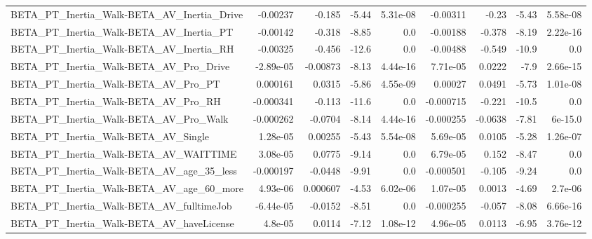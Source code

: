 \begin{tabular}{lrrrrrrrr}
BETA\_PT\_Inertia\_Walk-BETA\_AV\_Inertia\_Drive         &    -0.00237 &       -0.185 &    -5.44 & 5.31e-08 &   -0.00311 &       -0.23 &        -5.43 &      5.58e-08 \\
BETA\_PT\_Inertia\_Walk-BETA\_AV\_Inertia\_PT            &    -0.00142 &       -0.318 &    -8.85 &      0.0 &   -0.00188 &      -0.378 &        -8.19 &      2.22e-16 \\
BETA\_PT\_Inertia\_Walk-BETA\_AV\_Inertia\_RH            &    -0.00325 &       -0.456 &    -12.6 &      0.0 &   -0.00488 &      -0.549 &        -10.9 &           0.0 \\
BETA\_PT\_Inertia\_Walk-BETA\_AV\_Pro\_Drive             &   -2.89e-05 &     -0.00873 &    -8.13 & 4.44e-16 &   7.71e-05 &      0.0222 &         -7.9 &      2.66e-15 \\
BETA\_PT\_Inertia\_Walk-BETA\_AV\_Pro\_PT                &    0.000161 &       0.0315 &    -5.86 & 4.55e-09 &    0.00027 &      0.0491 &        -5.73 &      1.01e-08 \\
BETA\_PT\_Inertia\_Walk-BETA\_AV\_Pro\_RH                &   -0.000341 &       -0.113 &    -11.6 &      0.0 &  -0.000715 &      -0.221 &        -10.5 &           0.0 \\
BETA\_PT\_Inertia\_Walk-BETA\_AV\_Pro\_Walk              &   -0.000262 &      -0.0704 &    -8.14 & 4.44e-16 &  -0.000255 &     -0.0638 &        -7.81 &       6e-15.0 \\
BETA\_PT\_Inertia\_Walk-BETA\_AV\_Single                &    1.28e-05 &      0.00255 &    -5.43 & 5.54e-08 &   5.69e-05 &      0.0105 &        -5.28 &      1.26e-07 \\
BETA\_PT\_Inertia\_Walk-BETA\_AV\_WAITTIME              &    3.08e-05 &       0.0775 &    -9.14 &      0.0 &   6.79e-05 &       0.152 &        -8.47 &           0.0 \\
BETA\_PT\_Inertia\_Walk-BETA\_AV\_age\_35\_less           &   -0.000197 &      -0.0448 &    -9.91 &      0.0 &  -0.000501 &      -0.105 &        -9.24 &           0.0 \\
BETA\_PT\_Inertia\_Walk-BETA\_AV\_age\_60\_more           &    4.93e-06 &     0.000607 &    -4.53 & 6.02e-06 &   1.07e-05 &      0.0013 &        -4.69 &       2.7e-06 \\
BETA\_PT\_Inertia\_Walk-BETA\_AV\_fulltimeJob           &   -6.44e-05 &      -0.0152 &    -8.51 &      0.0 &  -0.000255 &      -0.057 &        -8.08 &      6.66e-16 \\
BETA\_PT\_Inertia\_Walk-BETA\_AV\_haveLicense           &     4.8e-05 &       0.0114 &    -7.12 & 1.08e-12 &   4.96e-05 &      0.0113 &        -6.95 &      3.76e-12 \\

\end{tabular}

